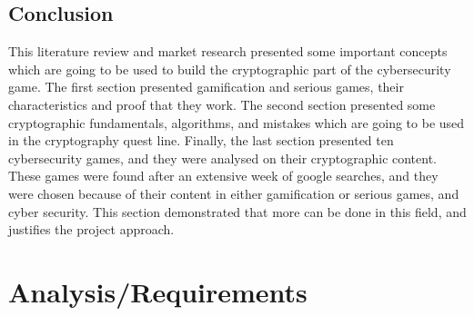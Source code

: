 \documentclass{l4proj}
\begin{document}
\section{Conclusion}

This literature review and market research presented some important concepts which are going to be used to build the cryptographic part of the cybersecurity game.
The first section presented gamification and serious games, their characteristics and proof that they work. 
The second section presented some cryptographic fundamentals, algorithms, and mistakes which are going to be used in the cryptography quest line.
Finally, the last section presented ten cybersecurity games, and they were analysed on their cryptographic content.
These games were found after an extensive week of google searches, and they were chosen because of their content in either gamification or serious games, and cyber security. 
This section demonstrated that more can be done in this field, and justifies the project approach.

\chapter{Analysis/Requirements}
\end{document}
